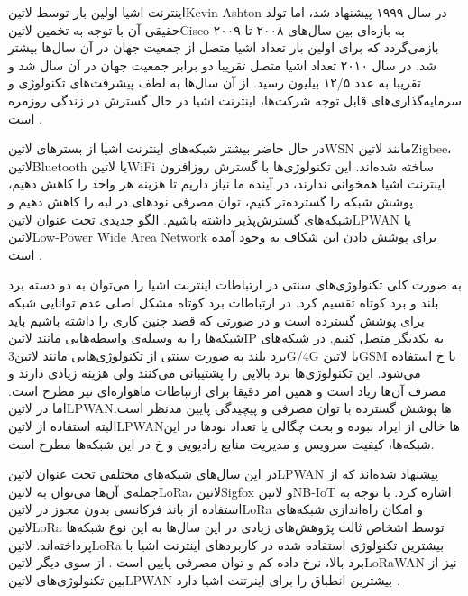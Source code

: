 
اینترنت اشیا اولین بار توسط ‌لاتین{Kevin Ashton} در سال ۱۹۹۹ پیشنهاد شد، اما تولد حقیقی آن
با توجه به تخمین ‌لاتین{Cisco} به بازه‌ای بین سال‌های ۲۰۰۸ تا ۲۰۰۹ بازمی‌گردد که برای اولین بار تعداد اشیا
متصل از جمعیت جهان در آن سال‌ها بیشتر شد. در سال ۲۰۱۰ تعداد اشیا متصل تقریبا دو برابر جمعیت جهان در آن سال شد و تقریبا به عدد ۱۲/۵ بیلیون رسید.
از آن سال‌ها به لطف پیشرفت‌های تکنولوژی و سرمایه‌گذاری‌های قابل توجه شرکت‌ها، اینترنت اشیا در حال گسترش در زندگی روزمره است
.

در حال حاضر بیشتر شبکه‌های اینترنت اشیا از بسترهای ‌لاتین{WSN} مانند ‌لاتین{Zigbee}، ‌لاتین{Bluetooth} یا ‌لاتین{WiFi} ساخته شده‌اند.
این تکنولوژی‌ها با گسترش روزافزون اینترنت اشیا همخوانی ندارند، در آینده ما نیاز داریم تا هزینه هر واحد را کاهش دهیم، پوشش شبکه را گسترده‌تر کنیم، توان مصرفی نودهای در لبه را کاهش دهیم و شبکه‌های گسترش‌پذیر داشته باشیم.
الگو جدیدی تحت عنوان ‌لاتین{LPWAN} یا ‌لاتین{Low-Power Wide Area Network} برای پوشش دادن این شکاف به وجود آمده است .

به صورت کلی تکنولوژی‌های سنتی در ارتباطات اینترنت اشیا را می‌توان به دو دسته برد بلند و برد کوتاه تقسیم کرد. در ارتباطات برد کوتاه مشکل اصلی عدم توانایی شبکه برای پوشش گسترده است و در صورتی که قصد چنین کاری را داشته باشیم
باید شبکه‌ها را به وسیله‌ی واسطه‌هایی مانند ‌لاتین{IP} به یکدیگر متصل کنیم. در شبکه‌های برد بلند به صورت سنتی از تکنولوژی‌هایی مانند ‌لاتین{3G/4G} یا ‌لاتین{GSM} یا ‌خ استفاده می‌شود.
این تکنولوژی‌ها برد بالایی را پشتیبانی می‌کنند ولی هزینه زیادی دارند و مصرف آن‌ها زیاد است و همین امر دقیقا برای ارتباطات ماهواره‌ای نیز مطرح است. اما در ‌لاتین{LPWAN}ها پوشش گسترده با توان مصرفی و پیچیدگی پایین مدنظر است.
البته استفاده از ‌لاتین{LPWAN}ها خالی از ایراد نبوده و بحث چگالی یا تعداد نودها در این شبکه‌ها، کیفیت سرویس و مدیریت منابع رادیویی و ‌خ در این شبکه‌ها مطرح است.

در این سال‌های شبکه‌های مختلفی تحت عنوان ‌لاتین{LPWAN} پیشنهاد شده‌اند که از جمله‌ی آن‌ها می‌توان به ‌لاتین{LoRa}، ‌لاتین{Sigfox} و ‌لاتین{NB-IoT} اشاره کرد.
با توجه به استفاده از باند فرکانسی بدون مجوز در ‌لاتین{LoRa} و امکان راه‌اندازی شبکه‌های ‌لاتین{LoRa} توسط اشخاص ثالث پژوهش‌های زیادی در این سال‌ها به این نوع شبکه‌ها پرداخته‌اند.
‌لاتین{LoRa} بیشترین تکنولوژی استفاده شده در کاربردهای اینترنت اشیا با برد بالا، نرخ داده کم و توان مصرفی پایین است .
از سوی دیگر ‌لاتین{LoRaWAN} نیز از بین تکنولوژی‌های ‌لاتین{LPWAN} بیشترین انطباق را برای اینرتنت اشیا دارد .

